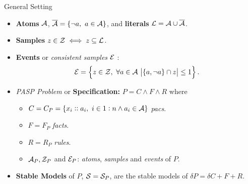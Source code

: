 \documentclass{beamer}
\newcommand{\co}[1]{\ensuremath{\overline{#1}}}
\newcommand{\fml}[1]{\ensuremath{{\cal #1}}}
\newcommand{\cset}[2]{\ensuremath{\set{#1,~#2}}}
\begin{document}
\begin{frame}{General Setting}
    \begin{itemize}    
        \item  \textbf{Atoms} $\fml{A}$,
        $\overline{\fml{A}} = \cset{\neg a}{a \in \fml{A}}$, and \textbf{literals} $\fml{L} = \fml{A} \cup \co{\fml{A}}$.
        \item \textbf{Samples} $z \in  \fml{Z} \iff z \subseteq \fml{L}$.
        \item \textbf{Events} or \textit{consistent samples} $\fml{E}$ :
        $$\fml{E} = \cset{z \in \fml{Z} }{ \forall a \in \fml{A}~\envert{\set{a,\neg a} \cap z} \leq 1}.$$
        \item \textit{PASP Problem}  or \textbf{Specification:} $P = C \land F \land R$ where
            \begin{itemize}
                \item $C = C_P = \cset{x_i :: a_i }{ i \in 1:n \land  a_i \in \fml{A}}$ \textit{pacs}.
                \item $F = F_P$ \textit{facts}.
                \item $R = R_P$ \textit{rules}.
                \item $\fml{A}_P, \fml{Z}_P$ and $\fml{E}_P$: \textit{atoms}, \textit{samples} and \textit{events} of $P$.
            \end{itemize}
        \item \textbf{Stable Models} of $P$, $\fml{S} = \fml{S}_P$, are the stable models of $\delta P = \delta C + F + R$.
    \end{itemize}
\end{frame}
\end{document}
